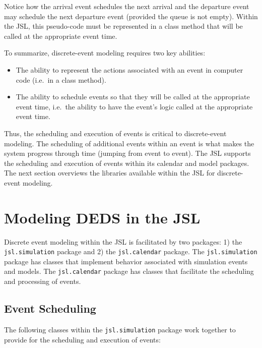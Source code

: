\documentclass[
]{book}
\theoremstyle{definition}
\theoremstyle{definition}
\theoremstyle{definition}
\theoremstyle{definition}
\theoremstyle{remark}
\begin{document}
Notice how the arrival event schedules the next arrival and the
departure event may schedule the next departure event (provided the
queue is not empty). Within the JSL, this pseudo-code must be
represented in a class method that will be called at the appropriate
event time.

To summarize, discrete-event modeling requires two key abilities:

\begin{itemize}
\item
  The ability to represent the actions associated with an event in
  computer code (i.e.~in a class method).
\item
  The ability to schedule events so that they will be called at the
  appropriate event time, i.e.~the ability to have the event's logic
  called at the appropriate event time.
\end{itemize}

Thus, the scheduling and execution of events is critical to
discrete-event modeling. The scheduling of additional events within an
event is what makes the system progress through time (jumping from event
to event). The JSL supports the scheduling and execution of events
within its calendar and model packages. The next section overviews the
libraries available within the JSL for discrete-event modeling.

\hypertarget{introDEDS:dedsJSL}{%
\section{Modeling DEDS in the JSL}\label{introDEDS:dedsJSL}}

Discrete event modeling within the JSL is facilitated by two packages:
1) the \texttt{jsl.simulation} package and 2) the \texttt{jsl.calendar} package. The \texttt{jsl.simulation}
package has classes that implement behavior associated with simulation
events and models. The \texttt{jsl.calendar} package has classes that facilitate the
scheduling and processing of events.

\hypertarget{event-scheduling}{%
\subsection{Event Scheduling}\label{event-scheduling}}

The following classes within the \texttt{jsl.simulation} package work together to
provide for the scheduling and execution of events:
\end{document}
